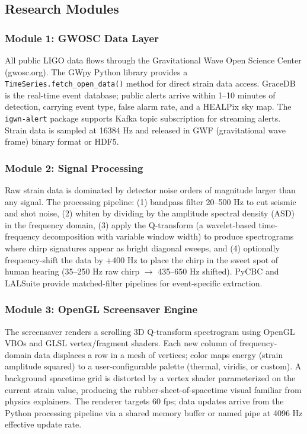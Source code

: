 \documentclass[11pt,letterpaper]{article}
\begin{document}
\subsection{Research Modules}

\subsubsection{Module 1: GWOSC Data Layer}

All public LIGO data flows through the Gravitational Wave Open Science Center (gwosc.org). The GWpy Python library provides a \texttt{TimeSeries.fetch\_open\_data()} method for direct strain data access. GraceDB is the real-time event database; public alerts arrive within 1--10 minutes of detection, carrying event type, false alarm rate, and a HEALPix sky map. The \texttt{igwn-alert} package supports Kafka topic subscription for streaming alerts. Strain data is sampled at 16384 Hz and released in GWF (gravitational wave frame) binary format or HDF5.

\subsubsection{Module 2: Signal Processing}

Raw strain data is dominated by detector noise orders of magnitude larger than any signal. The processing pipeline: (1) bandpass filter 20--500 Hz to cut seismic and shot noise, (2) whiten by dividing by the amplitude spectral density (ASD) in the frequency domain, (3) apply the Q-transform (a wavelet-based time-frequency decomposition with variable window width) to produce spectrograms where chirp signatures appear as bright diagonal sweeps, and (4) optionally frequency-shift the data by +400 Hz to place the chirp in the sweet spot of human hearing (35--250 Hz raw chirp $\rightarrow$ 435--650 Hz shifted). PyCBC and LALSuite provide matched-filter pipelines for event-specific extraction.

\subsubsection{Module 3: OpenGL Screensaver Engine}

The screensaver renders a scrolling 3D Q-transform spectrogram using OpenGL VBOs and GLSL vertex/fragment shaders. Each new column of frequency-domain data displaces a row in a mesh of vertices; color maps energy (strain amplitude squared) to a user-configurable palette (thermal, viridis, or custom). A background spacetime grid is distorted by a vertex shader parameterized on the current strain value, producing the rubber-sheet-of-spacetime visual familiar from physics explainers. The renderer targets 60 fps; data updates arrive from the Python processing pipeline via a shared memory buffer or named pipe at 4096 Hz effective update rate.
\end{document}

